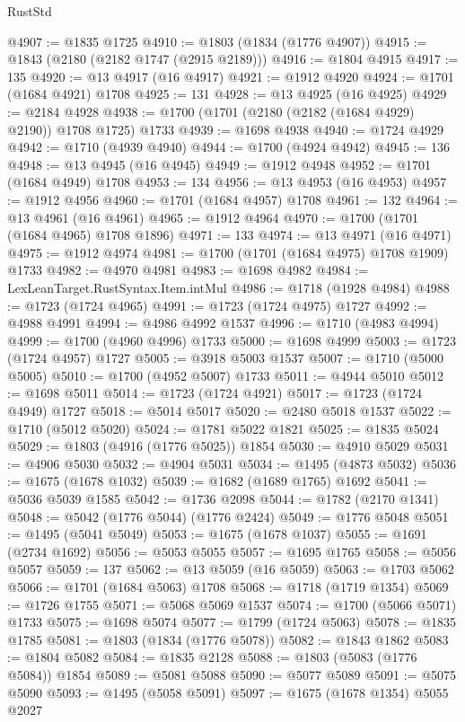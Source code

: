 \begin{lexlean}{RustStd}
\begin{coremodule}
@4907 := @1835 @1725
@4910 := @1803 (@1834 (@1776 @4907))
@4915 := @1843 (@2180 (@2182 @1747 (@2915 @2189)))
@4916 := @1804 @4915
@4917 := 135
@4920 := @13 @4917 (@16 @4917)
@4921 := @1912 @4920
@4924 := @1701 (@1684 @4921) @1708
@4925 := 131
@4928 := @13 @4925 (@16 @4925)
@4929 := @2184 @4928
@4938 := @1700 (@1701 (@2180 (@2182 (@1684 @4929) @2190)) @1708 @1725) @1733
@4939 := @1698 @4938
@4940 := @1724 @4929
@4942 := @1710 (@4939 @4940)
@4944 := @1700 (@4924 @4942)
@4945 := 136
@4948 := @13 @4945 (@16 @4945)
@4949 := @1912 @4948
@4952 := @1701 (@1684 @4949) @1708
@4953 := 134
@4956 := @13 @4953 (@16 @4953)
@4957 := @1912 @4956
@4960 := @1701 (@1684 @4957) @1708
@4961 := 132
@4964 := @13 @4961 (@16 @4961)
@4965 := @1912 @4964
@4970 := @1700 (@1701 (@1684 @4965) @1708 @1896)
@4971 := 133
@4974 := @13 @4971 (@16 @4971)
@4975 := @1912 @4974
@4981 := @1700 (@1701 (@1684 @4975) @1708 @1909) @1733
@4982 := @4970 @4981
@4983 := @1698 @4982
@4984 := LexLeanTarget.RustSyntax.Item.intMul
@4986 := @1718 (@1928 @4984)
@4988 := @1723 (@1724 @4965)
@4991 := @1723 (@1724 @4975) @1727
@4992 := @4988 @4991
@4994 := @4986 @4992 @1537
@4996 := @1710 (@4983 @4994)
@4999 := @1700 (@4960 @4996) @1733
@5000 := @1698 @4999
@5003 := @1723 (@1724 @4957) @1727
@5005 := @3918 @5003 @1537
@5007 := @1710 (@5000 @5005)
@5010 := @1700 (@4952 @5007) @1733
@5011 := @4944 @5010
@5012 := @1698 @5011
@5014 := @1723 (@1724 @4921)
@5017 := @1723 (@1724 @4949) @1727
@5018 := @5014 @5017
@5020 := @2480 @5018 @1537
@5022 := @1710 (@5012 @5020)
@5024 := @1781 @5022 @1821
@5025 := @1835 @5024
@5029 := @1803 (@4916 (@1776 @5025)) @1854
@5030 := @4910 @5029
@5031 := @4906 @5030
@5032 := @4904 @5031
@5034 := @1495 (@4873 @5032)
@5036 := @1675 (@1678 @1032)
@5039 := @1682 (@1689 @1765) @1692
@5041 := @5036 @5039 @1585
@5042 := @1736 @2098
@5044 := @1782 (@2170 @1341)
@5048 := @5042 (@1776 @5044) (@1776 @2424)
@5049 := @1776 @5048
@5051 := @1495 (@5041 @5049)
@5053 := @1675 (@1678 @1037)
@5055 := @1691 (@2734 @1692)
@5056 := @5053 @5055
@5057 := @1695 @1765
@5058 := @5056 @5057
@5059 := 137
@5062 := @13 @5059 (@16 @5059)
@5063 := @1703 @5062
@5066 := @1701 (@1684 @5063) @1708
@5068 := @1718 (@1719 @1354)
@5069 := @1726 @1755
@5071 := @5068 @5069 @1537
@5074 := @1700 (@5066 @5071) @1733
@5075 := @1698 @5074
@5077 := @1799 (@1724 @5063)
@5078 := @1835 @1785
@5081 := @1803 (@1834 (@1776 @5078))
@5082 := @1843 @1862
@5083 := @1804 @5082
@5084 := @1835 @2128
@5088 := @1803 (@5083 (@1776 @5084)) @1854
@5089 := @5081 @5088
@5090 := @5077 @5089
@5091 := @5075 @5090
@5093 := @1495 (@5058 @5091)
@5097 := @1675 (@1678 @1354) @5055 @2027

\end{coremodule}
\end{lexlean}
